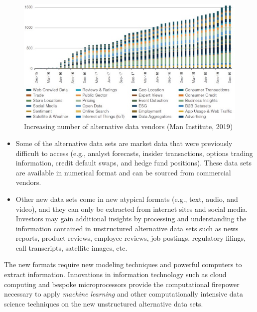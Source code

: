 \documentclass[
]{book}
\begin{document}
\begin{figure}
\includegraphics[width=0.9\linewidth]{images/chapter3/alt_data} \caption{Increasing number of alternative data vendors (Man Institute, 2019)}\label{fig:unnamed-chunk-3}
\end{figure}

\begin{itemize}
\item
  Some of the alternative data sets are market data that were previously difficult to access (e.g., analyst forecasts, insider transactions, options trading information, credit default swaps, and hedge fund positions). These data sets are available in numerical format and can be sourced from commercial vendors.
\item
  Other new data sets come in new atypical formats (e.g., text, audio, and video), and they can only be extracted from internet sites and social media. Investors may gain additional insights by processing and understanding the information contained in unstructured alternative data sets such as news reports, product reviews, employee reviews, job postings, regulatory filings, call transcripts, satellite images, etc.
\end{itemize}

The new formats require new modeling techniques and powerful computers to extract information. Innovations in information technology such as cloud computing and bespoke microprocessors provide the computational firepower necessary to apply {\emph{machine learning}} and other computationally intensive data science techniques on the new unstructured alternative data sets.
\end{document}
